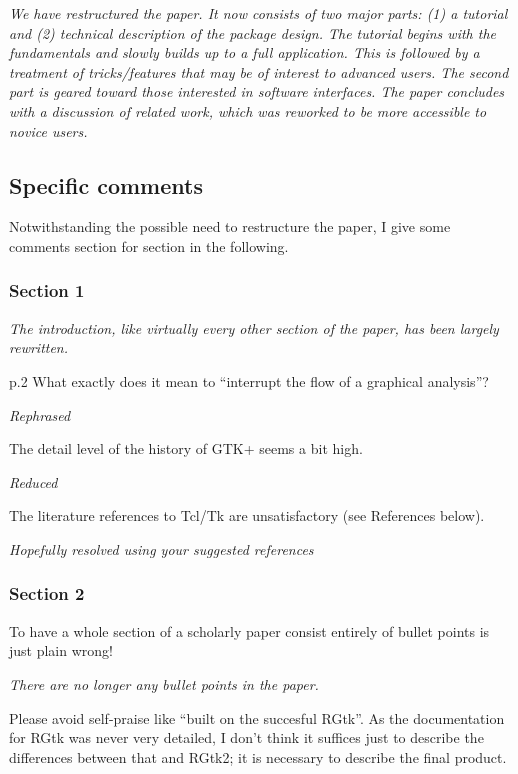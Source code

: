 \documentclass{article}
\begin{document}
\emph{We have restructured the paper. It now consists of two major parts: 
(1) a tutorial and (2) technical description of the package design. The tutorial
begins with the fundamentals and slowly builds up to a full application. This 
is followed by a treatment of tricks/features that may be of interest to
advanced users. The second part is geared toward those interested in software
interfaces. The paper concludes with a discussion of related work, which was 
reworked to be more accessible to novice users.}

\subsection*{Specific comments}

Notwithstanding the possible need to restructure the paper, I give some comments
section for section in the following.

\subsubsection*{Section 1}

\emph{The introduction, like virtually every other section of the paper, has
been largely rewritten.}

p.2 What exactly does it mean to ``interrupt the flow of a graphical analysis''?

\emph{Rephrased}

The detail level of the history of GTK+ seems a bit high.

\emph{Reduced}

The literature references to Tcl/Tk are unsatisfactory (see References below).

\emph{Hopefully resolved using your suggested references}

\subsubsection*{Section 2}

To have a whole section of a scholarly paper consist entirely of bullet points is
just plain wrong!

\emph{There are no longer any bullet points in the paper.}

Please avoid self-praise like ``built on the succesful RGtk''.
As the documentation for RGtk was never very detailed, I don't think it suffices
just to describe the differences between that and RGtk2; it is necessary to describe
the final product. 
\end{document}

